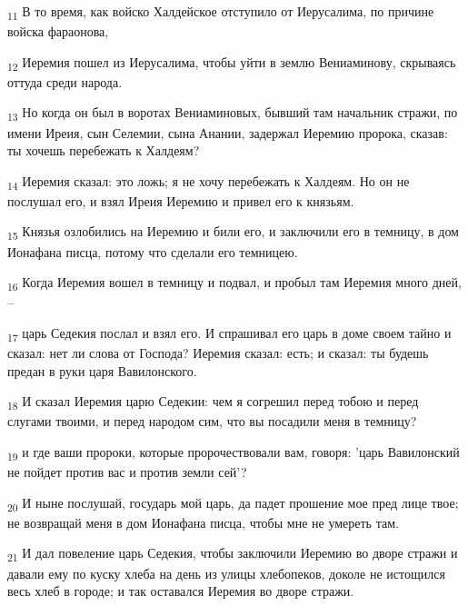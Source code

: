 \begin{tcolorbox}
\textsubscript{11} В то время, как войско Халдейское отступило от Иерусалима, по причине войска фараонова,
\end{tcolorbox}
\begin{tcolorbox}
\textsubscript{12} Иеремия пошел из Иерусалима, чтобы уйти в землю Вениаминову, скрываясь оттуда среди народа.
\end{tcolorbox}
\begin{tcolorbox}
\textsubscript{13} Но когда он был в воротах Вениаминовых, бывший там начальник стражи, по имени Иреия, сын Селемии, сына Анании, задержал Иеремию пророка, сказав: ты хочешь перебежать к Халдеям?
\end{tcolorbox}
\begin{tcolorbox}
\textsubscript{14} Иеремия сказал: это ложь; я не хочу перебежать к Халдеям. Но он не послушал его, и взял Иреия Иеремию и привел его к князьям.
\end{tcolorbox}
\begin{tcolorbox}
\textsubscript{15} Князья озлобились на Иеремию и били его, и заключили его в темницу, в дом Ионафана писца, потому что сделали его темницею.
\end{tcolorbox}
\begin{tcolorbox}
\textsubscript{16} Когда Иеремия вошел в темницу и подвал, и пробыл там Иеремия много дней, --
\end{tcolorbox}
\begin{tcolorbox}
\textsubscript{17} царь Седекия послал и взял его. И спрашивал его царь в доме своем тайно и сказал: нет ли слова от Господа? Иеремия сказал: есть; и сказал: ты будешь предан в руки царя Вавилонского.
\end{tcolorbox}
\begin{tcolorbox}
\textsubscript{18} И сказал Иеремия царю Седекии: чем я согрешил перед тобою и перед слугами твоими, и перед народом сим, что вы посадили меня в темницу?
\end{tcolorbox}
\begin{tcolorbox}
\textsubscript{19} и где ваши пророки, которые пророчествовали вам, говоря: 'царь Вавилонский не пойдет против вас и против земли сей'?
\end{tcolorbox}
\begin{tcolorbox}
\textsubscript{20} И ныне послушай, государь мой царь, да падет прошение мое пред лице твое; не возвращай меня в дом Ионафана писца, чтобы мне не умереть там.
\end{tcolorbox}
\begin{tcolorbox}
\textsubscript{21} И дал повеление царь Седекия, чтобы заключили Иеремию во дворе стражи и давали ему по куску хлеба на день из улицы хлебопеков, доколе не истощился весь хлеб в городе; и так оставался Иеремия во дворе стражи.
\end{tcolorbox}
